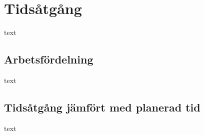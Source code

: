 \documentclass[efterstudie/studie.tex]{subfiles}
\begin{document}
\section{Tidsåtgång}
text
\subsection{Arbetsfördelning}
text
\subsection{Tidsåtgång jämfört med planerad tid}
text
\end{document}
